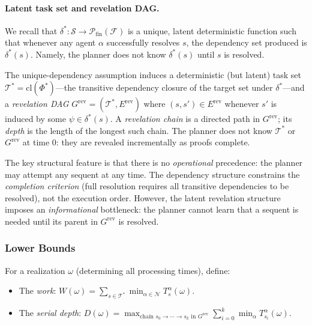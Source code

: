 \paragraph{Latent task set and revelation DAG.}

We recall that $\delta^*:\mathcal{S}\to\mathcal{P}_{\mathrm{fin}}(\mathcal{F})$ is a unique, latent deterministic function such that whenever any agent $\alpha$ successfully resolves $s$, the dependency set produced is $\delta^*(s)$. Namely, the planner does not know $\delta^*(s)$ until $s$ is resolved.

The unique-dependency assumption induces a deterministic (but latent) task set $\mathcal{T}^* = \mathrm{cl}(\Phi^*)$---the transitive dependency closure of the target set under $\delta^*$---and a \emph{revelation DAG} $G^{\mathrm{rev}} = (\mathcal{T}^*, E^{\mathrm{rev}})$ where $(s,s')\in E^{\mathrm{rev}}$ whenever $s'$ is induced by some $\psi\in\delta^*(s)$. A \emph{revelation chain} is a directed path in $G^{\mathrm{rev}}$; its \emph{depth} is the length of the longest such chain. The planner does not know $\mathcal{T}^*$ or $G^{\mathrm{rev}}$ at time $0$: they are revealed incrementally as proofs complete.

The key structural feature is that there is no \emph{operational} precedence: the planner may attempt any sequent at any time. The dependency structure constrains the \emph{completion criterion} (full resolution requires all transitive dependencies to be resolved), not the execution order. However, the latent revelation structure imposes an \emph{informational} bottleneck: the planner cannot learn that a sequent is needed until its parent in $G^{\mathrm{rev}}$ is resolved.


\subsubsection{Lower Bounds}\label{sec:lower-bounds}

\begin{definition}\label{def:work-depth}
For a realization $\omega$ (determining all processing times), define:
\begin{itemize}
    \item The \emph{work}: $\displaystyle W(\omega) = \sum_{s\in\mathcal{T}^*} \min_{\alpha\in\mathcal{N}} T^\alpha_s(\omega)$.
    \item The \emph{serial depth}: $\displaystyle D(\omega) = \max_{\text{chain } s_0\to\cdots\to s_k \text{ in } G^{\mathrm{rev}}} \sum_{i=0}^{k} \min_{\alpha} T^\alpha_{s_i}(\omega)$.
\end{itemize}
\end{definition}


